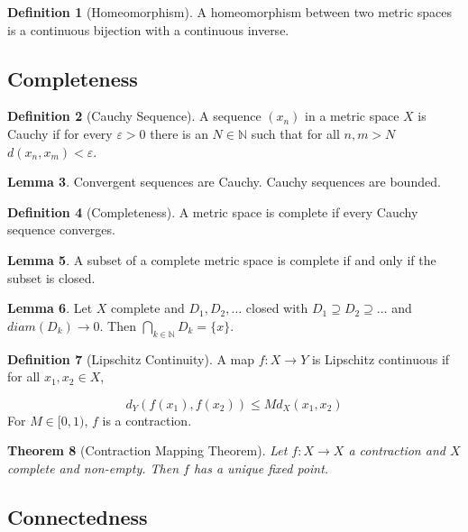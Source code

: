 \documentclass[11pt,a4paper, titlepage]{article}
\newtheorem{theorem}{Theorem}[section]
\theoremstyle{definition}
\newtheorem{definition}[theorem]{Definition}
\newtheorem{lemma}[theorem]{Lemma}
\begin{document}
\begin{definition}[Homeomorphism]
A homeomorphism between two metric spaces is a continuous bijection with a continuous inverse. 
\end{definition}

\subsection{Completeness}

\begin{definition}[Cauchy Sequence]
A sequence $(x_n)$ in a metric space $X$ is Cauchy if for every $\varepsilon > 0$ there is an $N \in \mathbb{N}$ such that for all $n,m > N$ $d(x_n, x_m) < \varepsilon$.
\end{definition}

\begin{lemma}
Convergent sequences are Cauchy. Cauchy sequences are bounded.
\end{lemma}

\begin{definition}[Completeness]
A metric space is complete if every Cauchy sequence converges.
\end{definition}

\begin{lemma}
A subset of a complete metric space is complete if and only if the subset is closed.
\end{lemma}

\begin{lemma}
Let $X$ complete and $D_1, D_2, \ldots$ closed with $D_1 \supseteq D_2 \supseteq \ldots$ and $diam(D_k) \to 0$. Then $\bigcap_{k \in \mathbb{N}} D_k = \{x\}$.
\end{lemma}

\begin{definition}[Lipschitz Continuity]
A map $f \colon X \longrightarrow Y$ is Lipschitz continuous if for all $x_1, x_2 \in X$,

\[
	d_Y(f(x_1),f(x_2)) \leqslant M d_X(x_1,x_2)
\]
For $M \in [0,1)$, $f$ is a contraction.
\end{definition}

\begin{theorem}[Contraction Mapping Theorem]
Let $f \colon X \longrightarrow X$ a contraction and $X$ complete and non-empty. Then $f$ has a unique fixed point.
\end{theorem}

\subsection{Connectedness}
\end{document}
